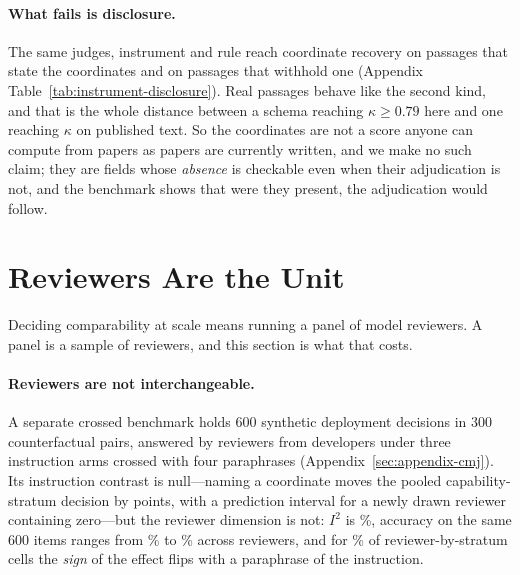 \documentclass[11pt]{article}
\begin{document}
\paragraph{What fails is disclosure.}
The same judges, instrument and rule reach \InsCoordFull{} coordinate recovery
on passages that state the coordinates and \InsCoordPartial{} on passages that
withhold one (Appendix Table~\ref{tab:instrument-disclosure}). Real passages
behave like the second kind, and that is the whole distance between a schema
reaching $\kappa \geq 0.79$ here and one reaching $\kappa$ \DecCoordKMax{} on
published text. So the coordinates are not a score anyone can compute from
papers as papers are currently written, and we make no such claim; they are
fields whose \emph{absence} is checkable even when their adjudication is not,
and the benchmark shows that were they present, the adjudication would follow.

\section{Reviewers Are the Unit}
\label{sec:measurement}

Deciding comparability at scale means running a panel of model reviewers. A
panel is a sample of reviewers, and this section is what that costs.

\paragraph{Reviewers are not interchangeable.}
A separate crossed benchmark holds 600 synthetic deployment decisions in 300
counterfactual pairs, answered by \CMJmodels{} reviewers from \CMJdevelopers{}
developers under three instruction arms crossed with four paraphrases
(Appendix~\ref{sec:appendix-cmj}). Its instruction contrast is null---naming a
coordinate moves the pooled capability-stratum decision by \CMJCtwoPooled{}
points, with a prediction interval for a newly drawn reviewer containing
zero---but the reviewer dimension is not: $I^2$ is \CMJCtwoIsq\%, accuracy on
the same 600 items ranges from \CMJprobeMin\% to \CMJprobeMax\% across
reviewers, and for \CMJSignBelowHalf\% of reviewer-by-stratum cells the
\emph{sign} of the effect flips with a paraphrase of the instruction.
\end{document}
